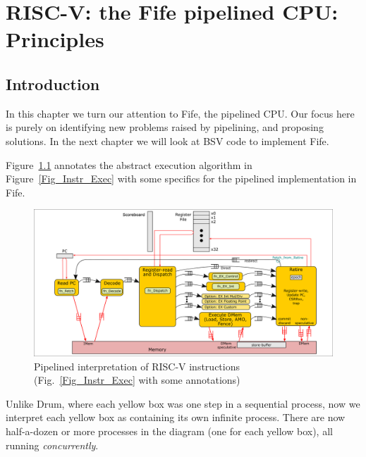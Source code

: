 

\chapter{RISC-V: the Fife pipelined CPU: Principles}


\setcounter{page}{1}
\renewcommand{\thepage}{\arabic{chapter}-\arabic{page}}

\label{ch_Fife_Principles}


\section{Introduction}

In this chapter we turn our attention to Fife, the pipelined CPU.  Our
focus here is purely on identifying new problems raised by pipelining,
and proposing solutions.  In the next chapter we will look at BSV code
to implement Fife.

Figure~\ref{Fig_Instr_Exec_w_FIFOs} annotates the abstract execution
algorithm in Figure~\ref{Fig_Instr_Exec} with some specifics for the
pipelined implementation in Fife.
\begin{figure}[htbp]
  \centerline{\includegraphics[width=6in,angle=0]{Figures/Fig_Instr_Exec_w_FIFOs}}
  \caption{\label{Fig_Instr_Exec_w_FIFOs}Pipelined interpretation of RISC-V instructions (Fig.~\ref{Fig_Instr_Exec} with some annotations)}
\end{figure}
Unlike Drum, where each yellow box was one step in a sequential
process, now we interpret each yellow box as containing its own
infinite process.  There are now half-a-dozen or more processes in the
diagram (one for each yellow box), all running \emph{concurrently}.

